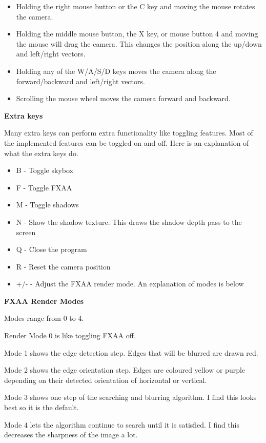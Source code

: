 \documentclass[10pt]{article}
\begin{document}
	\begin{itemize}
		\item Holding the right mouse button or the C key and moving the mouse rotates the camera.
		\item Holding the middle mouse button, the X key, or mouse button 4 and moving the mouse will drag the camera. This changes the position along the up/down and left/right vectors.
		\item Holding any of the W/A/S/D keys moves the camera along the forward/backward and left/right vectors.
		\item Scrolling the mouse wheel moves the camera forward and backward.
	\end{itemize}
	
	\begin{center}
		\bf Extra keys
	\end{center}
	Many extra keys can perform extra functionality like toggling features. Most of the implemented features can be toggled on and off. Here is an explanation of what the extra keys do.
	
	\begin{itemize}
		\item B - Toggle skybox
		\item F - Toggle FXAA
		\item M - Toggle shadows
		\item N - Show the shadow texture. This draws the shadow depth pass to the screen
		\item Q - Close the program
		\item R - Reset the camera position
		\item +/- - Adjust the FXAA render mode. An explanation of modes is below
	\end{itemize}
	
	\begin{center}
		\bf FXAA Render Modes
	\end{center}
	
	Modes range from 0 to 4.
	
	Render Mode 0 is like toggling FXAA off.
	
	Mode 1 shows the edge detection step. Edges that will be blurred are drawn red.
	
	Mode 2 shows the edge orientation step. Edges are coloured yellow or purple depending on their detected orientation of horizontal or vertical.
	
	Mode 3 shows one step of the searching and blurring algorithm. I find this looks best so it is the default.
	
	Mode 4 lets the algorithm continue to search until it is satisfied. I find this decreases the sharpness of the image a lot.
\end{document}
